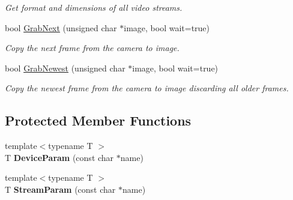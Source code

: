 \begin{DoxyCompactItemize}
\begin{DoxyCompactList}\small\item\em Get format and dimensions of all video streams. \end{DoxyCompactList}\item 
bool \hyperlink{classpangolin_1_1_pleora_video_aa9c01e6f43cebefb05aaaf847292de04}{Grab\+Next} (unsigned char $\ast$image, bool wait=true)
\begin{DoxyCompactList}\small\item\em Copy the next frame from the camera to image. \end{DoxyCompactList}\item 
bool \hyperlink{classpangolin_1_1_pleora_video_ae1984dd3f892a8cad426e692e21c6fb4}{Grab\+Newest} (unsigned char $\ast$image, bool wait=true)
\begin{DoxyCompactList}\small\item\em Copy the newest frame from the camera to image discarding all older frames. \end{DoxyCompactList}\end{DoxyCompactItemize}
\subsection*{Protected Member Functions}
\begin{DoxyCompactItemize}
\item 
{\footnotesize template$<$typename T $>$ }\\T {\bfseries Device\+Param} (const char $\ast$name)\hypertarget{classpangolin_1_1_pleora_video_a1d8195f4e6e01ef524320be368acb1b0}{}\label{classpangolin_1_1_pleora_video_a1d8195f4e6e01ef524320be368acb1b0}

\item 
{\footnotesize template$<$typename T $>$ }\\T {\bfseries Stream\+Param} (const char $\ast$name)\hypertarget{classpangolin_1_1_pleora_video_ad1b5da5a21c2fd9c56240a4962293131}{}\label{classpangolin_1_1_pleora_video_ad1b5da5a21c2fd9c56240a4962293131}

\end{DoxyCompactItemize}
